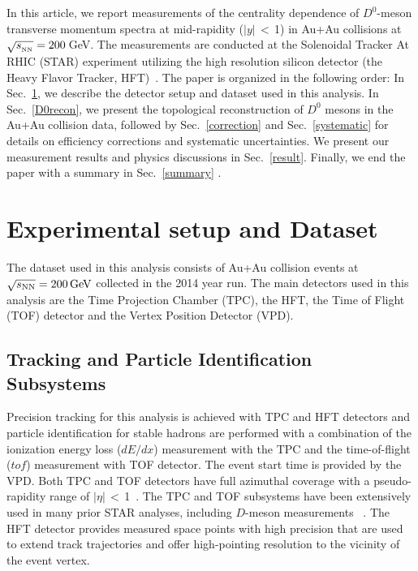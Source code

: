 \documentclass[%
 reprint,	
 amsmath,amssymb,
 aps,
 prc,
]{revtex4-1}
\begin{document}
In this article, we report measurements of the centrality dependence of $D^0$-meson transverse momentum spectra at mid-rapidity ($|y|$\,$<$\,1) in Au+Au collisions at $\sqrt{s_{_{\rm NN}}} = 200$\,GeV. The measurements are conducted at the Solenoidal Tracker At RHIC (STAR) experiment utilizing the high resolution silicon detector (the Heavy Flavor Tracker, HFT)~\cite{Contin:2017mck}. The paper is organized in the following order: In Sec.~\ref{dataset}, we describe the detector setup and dataset used in this analysis. In Sec.~\ref{D0recon}, we present the topological reconstruction of $D^0$ mesons in the Au+Au collision data, followed by Sec.~\ref{correction} and Sec.~\ref{systematic} for details on efficiency corrections and systematic uncertainties. We present our measurement results and physics discussions in Sec.~\ref{result}. Finally, we end the paper with a summary in Sec.~\ref{summary} .

\section{Experimental setup and Dataset}
\label{dataset}

The dataset used in this analysis consists of Au+Au collision events at ${\sqrt{s_{\rm NN}} = \rm{200\,GeV}}$ collected in the 2014 year run. The main detectors used in this analysis are the Time Projection Chamber (TPC), the HFT, the Time of Flight (TOF) detector and the Vertex Position Detector (VPD). 

\subsection{Tracking and Particle Identification Subsystems}
\label{dataset:tpctof}

Precision tracking for this analysis is achieved with TPC and HFT detectors and particle identification for stable hadrons are performed with a combination of the ionization energy loss ($dE/dx$) measurement with the TPC and the time-of-flight ($tof$) measurement with TOF detector. The event start time is provided by the VPD. Both TPC and TOF detectors have full azimuthal coverage with a pseudo-rapidity range of $|\eta|$\,$<$\,1~\cite{TPC,TOF}. The TPC and TOF subsystems have been extensively used in many prior STAR analyses, including $D$-meson measurements ~\cite{Star_D_pp,Star_D_RAA,Adamczyk:2015ukd}. The HFT detector provides measured space points with high precision that are used to extend track trajectories and offer high-pointing resolution to the vicinity of the event vertex.
\end{document}
